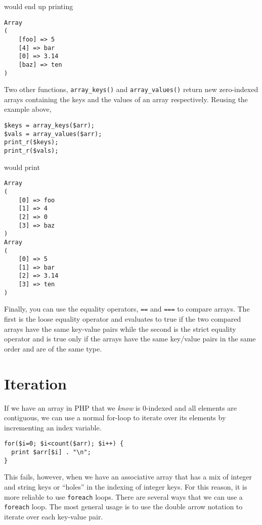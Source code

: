 would end up printing

\begin{verbatim}
Array
(
    [foo] => 5
    [4] => bar
    [0] => 3.14
    [baz] => ten
)
\end{verbatim}

Two other functions, \texttt{array_keys()} and 
\texttt{array_values()} return new zero-indexed
arrays containing the keys and the values of an array 
respectively.  Reusing the example above, 

\begin{verbatim}
$keys = array_keys($arr);
$vals = array_values($arr);
print_r($keys);
print_r($vals);
\end{verbatim}

would print

\begin{verbatim}
Array
(
    [0] => foo
    [1] => 4
    [2] => 0
    [3] => baz
)
Array
(
    [0] => 5
    [1] => bar
    [2] => 3.14
    [3] => ten
)
\end{verbatim}


Finally, you can use the equality operators, 
\texttt{==} and \texttt{===}
to compare arrays.  The first is the loose equality
operator and evaluates to true if the two compared
arrays have the same key-value pairs while the
second is the strict equality operator and is true
only if the arrays have the same key/value pairs in
the same order and are of the same type.

\section{Iteration}

If we have an array in PHP that we \emph{know} is
0-indexed and all elements are contiguous, we can 
use a normal for-loop to iterate over its elements
by incrementing an index variable.

\begin{verbatim}
for($i=0; $i<count($arr); $i++) {
  print $arr[$i] . "\n";
}
\end{verbatim}

This fails, however, when we have an associative array
that has a mix of integer and string keys or ``holes'' in
the indexing of integer keys.  For this reason, it is more
reliable to use \texttt{foreach} loops.  There
are several ways that we can use a \texttt{foreach}
loop.  The most general usage is to use the double arrow
notation to iterate over each key-value pair.

